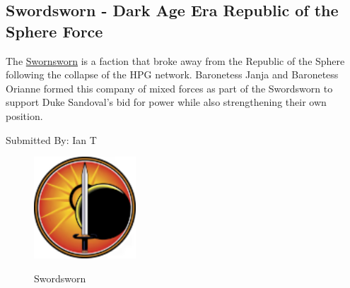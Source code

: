 \subsection{Swordsworn - Dark Age Era Republic of the Sphere Force}

The \href{https://www.sarna.net/wiki/Swordsworn}{Swornsworn} is a faction that broke away from the Republic of the Sphere following the collapse of the HPG network.
Baronetess Janja and Baronetess Orianne formed this company of mixed forces as part of the Swordsworn to support Duke Sandoval's bid for power while also strengthening their own position.

Submitted By: Ian T

\begin{figure}[!h]
  \centering
  \includegraphics[alt='Swordsworn Logo', width=1.5in, height=1.5in]{img/Swordsworn.png}
  \caption*{Swordsworn}
\end{figure}

